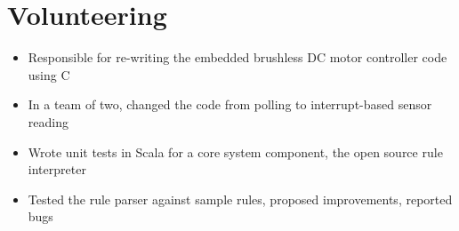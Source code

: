 \documentclass[]{rcf_cv}
\begin{document}
	\section{Volunteering}
	
		\begin{itemize}
			\setlength\itemsep{-0.4em}
			\renewcommand\labelitemi{--}
			
			\item Responsible for re-writing the embedded brushless DC motor controller code using C
			\item In a team of two, changed the code from polling to interrupt-based sensor reading
			
		\end{itemize}
	
		\begin{itemize}
			\setlength\itemsep{-0.4em}
			\renewcommand\labelitemi{--}
			
			\item Wrote unit tests in Scala for a core system component, the open source rule interpreter
			\item Tested the rule parser against sample rules, proposed improvements, reported bugs

		\end{itemize}

	


	
\end{document}
